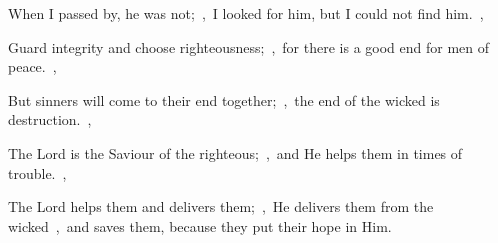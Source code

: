 \documentclass[12pt,twoside,a5paper]{article}
\begin{document}
\begin{normalparskip}
  When I passed by, he was not;~\sep\ I looked for him, but I could not find him.~\sep

  Guard integrity and choose righteousness;~\sep\ for there is a good end for men of peace.~\sep

  But sinners will come to their end together;~\sep\ the end of the wicked is destruction.~\sep

  The Lord is the Saviour of the righteous;~\sep\ and He helps them in times of trouble.~\sep

  The Lord helps them and delivers them;~\sep\ He delivers them from the wicked~\sep\ and saves them, because they put their hope in Him.
\end{normalparskip}



\end{document}
